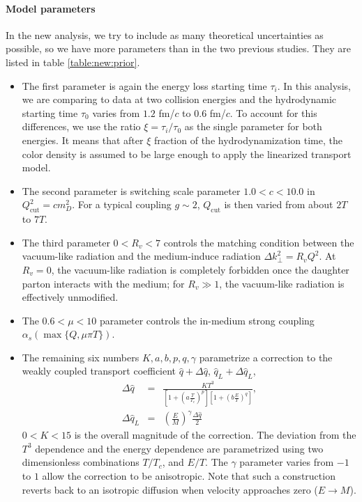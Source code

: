 \paragraph{Model parameters}
In the new analysis, we try to include as many theoretical uncertainties as possible, so we have more parameters than in the two previous studies.
They are listed in table \ref{table:new:prior}.
\begin{itemize}
\item The first parameter is again the energy loss starting time $\tau_i$.
In this analysis, we are comparing to data at two collision energies and the hydrodynamic starting time $\tau_0$ varies from $1.2$ fm/$c$ to $0.6$ fm/$c$.
To account for this differences, we use the ratio $\xi = \tau_i/\tau_0$ as the single parameter for both energies.
It means that after $\xi$ fraction of the hydrodynamization time, the color density is assumed to be large enough to apply the linearized transport model.
\item The second parameter is switching scale parameter $1.0 < c < 10.0$ in $Q_{\textrm{cut}}^2 = c m_D^2$. For a typical coupling $g\sim 2$, $Q_{\textrm{cut}}$ is then varied from about $2T$ to $7T$.
\item The third parameter $0<R_v<7$ controls the matching condition between the vacuum-like radiation and the medium-induce radiation $\Delta k_\perp^2 = R_v Q^2$.
At $R_v = 0$, the vacuum-like radiation is completely forbidden once the daughter parton interacts with the medium; for $R_v \gg 1$, the vacuum-like radiation is effectively unmodified.
\item The $0.6 < \mu < 10$ parameter controls the in-medium strong coupling $\alpha_s(\max\{Q, \mu\pi T\})$.
\item The remaining six numbers $K,a,b,p,q, \gamma$ parametrize a correction to the weakly coupled transport coefficient $\hat{q} + \Delta\hat{q}$, $\hat{q}_L + \Delta\hat{q}_L$,
\begin{eqnarray}
\Delta\hat{q} &=& \frac{K T^3}{\left[1+\left(a\frac{T}{T_c}\right)^p\right]\left[1+\left(b\frac{E}{T}\right)^q\right]}, \\
\Delta\hat{q}_L &=& \left(\frac{E}{M}\right)^\gamma \frac{\Delta\hat{q}}{2}
\end{eqnarray}
$0 < K < 15$ is the overall magnitude of the correction. 
The deviation from the $T^3$ dependence and the energy dependence are parametrized using two dimensionless combinations $T/T_c$, and $E/T$.
The $\gamma$ parameter varies from $-1$ to $1$ allow the correction to be anisotropic.
Note that such a construction reverts back to an isotropic diffusion when velocity approaches zero ($E\rightarrow M$).
\end{itemize}
